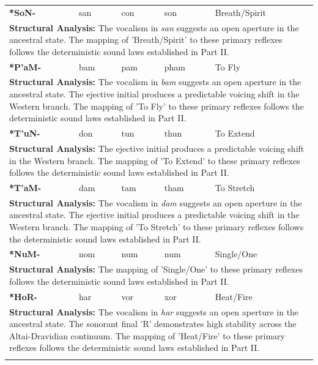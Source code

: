 \begin{longtable}{p{} p{} p{} p{} p{}}
\textbf{*SoN-} & san & con & son & Breath/Spirit \\ 
\multicolumn{5}{p{\textwidth}}{\small \textbf{Structural Analysis:} The vocalism in \textit{san} suggests an open aperture in the ancestral state. The mapping of 'Breath/Spirit' to these primary reflexes follows the deterministic sound laws established in Part II.} \\ \addlinespace[15pt] 
\textbf{*P'aM-} & bam & pam & pham & To Fly \\ 
\multicolumn{5}{p{\textwidth}}{\small \textbf{Structural Analysis:} The vocalism in \textit{bam} suggests an open aperture in the ancestral state. The ejective initial produces a predictable voicing shift in the Western branch. The mapping of 'To Fly' to these primary reflexes follows the deterministic sound laws established in Part II.} \\ \addlinespace[15pt] 
\textbf{*T'uN-} & don & tun & thun & To Extend \\ 
\multicolumn{5}{p{\textwidth}}{\small \textbf{Structural Analysis:} The ejective initial produces a predictable voicing shift in the Western branch. The mapping of 'To Extend' to these primary reflexes follows the deterministic sound laws established in Part II.} \\ \addlinespace[15pt] 
\textbf{*T'aM-} & dam & tam & tham & To Stretch \\ 
\multicolumn{5}{p{\textwidth}}{\small \textbf{Structural Analysis:} The vocalism in \textit{dam} suggests an open aperture in the ancestral state. The ejective initial produces a predictable voicing shift in the Western branch. The mapping of 'To Stretch' to these primary reflexes follows the deterministic sound laws established in Part II.} \\ \addlinespace[15pt] 
\textbf{*NuM-} & nom & num & num & Single/One \\ 
\multicolumn{5}{p{\textwidth}}{\small \textbf{Structural Analysis:}  The mapping of 'Single/One' to these primary reflexes follows the deterministic sound laws established in Part II.} \\ \addlinespace[15pt] 
\textbf{*HoR-} & har & vor & xor & Heat/Fire \\ 
\multicolumn{5}{p{\textwidth}}{\small \textbf{Structural Analysis:} The vocalism in \textit{har} suggests an open aperture in the ancestral state. The sonorant final 'R' demonstrates high stability across the Altai-Dravidian continuum. The mapping of 'Heat/Fire' to these primary reflexes follows the deterministic sound laws established in Part II.} \\ \addlinespace[15pt] 

\end{longtable}
